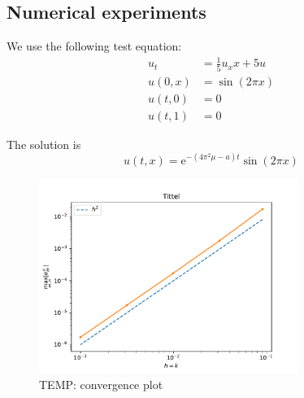 \subsection{Numerical experiments}

We use the following test equation:
\begin{align}
  u_t &= \frac{1}{5}u_xx + 5 u \\
  u(0, x) &= \sin (2\pi x) \\
  u(t, 0) &= 0 \\
  u(t, 1) &= 0
\end{align}

The solution is
\begin{equation}
  \label{eq:anal_sol}
  u(t, x) = \text{e}^{-(4\pi^2 \mu - a)t}\sin(2\pi x)
\end{equation}

\begin{figure}[h]
    \centering
    \includegraphics[width=0.75\textwidth]{Images/plots/temp_task1.pdf}
    \caption{TEMP: convergence plot}
    \label{fig:mesh1}
\end{figure}
